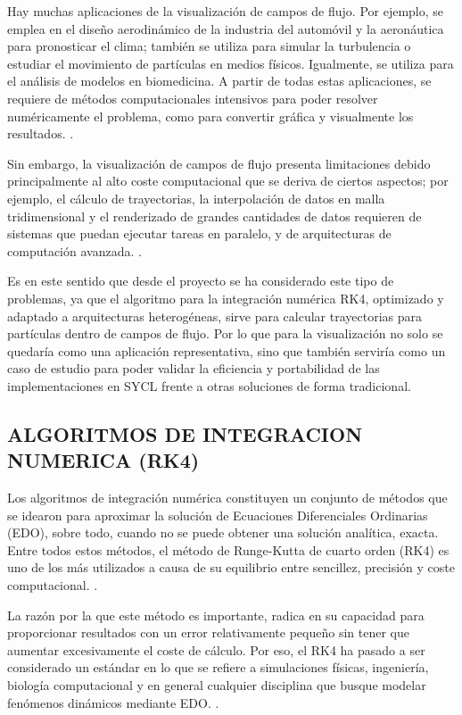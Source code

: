Hay muchas aplicaciones de la visualización de campos de flujo. Por ejemplo, se emplea en el diseño aerodinámico de la industria del automóvil y la aeronáutica para pronosticar el clima; también se utiliza para simular la turbulencia o estudiar el movimiento de partículas en medios físicos. Igualmente, se utiliza para el análisis de modelos en biomedicina. A partir de todas estas aplicaciones, se requiere de métodos computacionales intensivos para poder resolver numéricamente el problema, como para convertir gráfica y visualmente los resultados. \cite{laramee_state_2004} \cite{post_state_2003}.

Sin embargo, la visualización de campos de flujo presenta limitaciones debido principalmente al alto coste computacional que se deriva de ciertos aspectos; por ejemplo, el cálculo de trayectorias, la interpolación de datos en malla tridimensional y el renderizado de grandes cantidades de datos requieren de sistemas que puedan ejecutar tareas en paralelo, y de arquitecturas de computación avanzada. \cite{post_state_2003}.

Es en este sentido que desde el proyecto se ha considerado este tipo de problemas, ya que el algoritmo para la integración numérica RK4, optimizado y adaptado a arquitecturas heterogéneas, sirve para calcular trayectorias para partículas dentro de campos de flujo. Por lo que para la visualización no solo se quedaría como una aplicación representativa, sino que también serviría como un caso de estudio para poder validar la eficiencia y portabilidad de las implementaciones en SYCL frente a otras soluciones de forma tradicional.

\subsection{ALGORITMOS DE INTEGRACION NUMERICA (RK4)}

Los algoritmos de integración numérica constituyen un conjunto de métodos que se idearon para aproximar la solución de Ecuaciones Diferenciales Ordinarias (EDO), sobre todo, cuando no se puede obtener una solución analítica, exacta. Entre todos estos métodos, el método de Runge-Kutta de cuarto orden (RK4) es uno de los más utilizados a causa de su equilibrio entre sencillez, precisión y coste computacional. \cite{butcher_numerical_2008}.

La razón por la que este método es importante, radica en su capacidad para proporcionar resultados con un error relativamente pequeño sin tener que aumentar excesivamente el coste de cálculo. Por eso, el RK4 ha pasado a ser considerado un estándar en lo que se refiere a simulaciones físicas, ingeniería, biología computacional y en general cualquier disciplina que busque modelar fenómenos dinámicos mediante EDO. \cite{suli_introduction_2003}.

